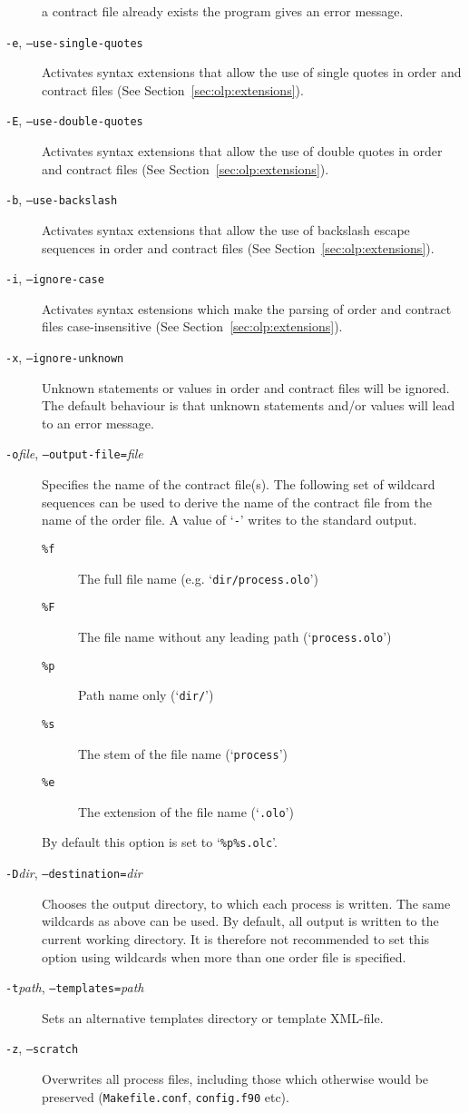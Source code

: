\begin{description}
      a contract file already exists the program gives an error message.
\item[\texttt{-e}, \texttt{--use-single-quotes}]
      Activates syntax extensions that allow the use of single quotes in
      order and contract files (See Section~\ref{sec:olp:extensions}).
\item[\texttt{-E}, \texttt{--use-double-quotes}]
      Activates syntax extensions that allow the use of double quotes in
      order and contract files (See Section~\ref{sec:olp:extensions}).
\item[\texttt{-b}, \texttt{--use-backslash}]
      Activates syntax extensions that allow the use of backslash escape
      sequences in
      order and contract files (See Section~\ref{sec:olp:extensions}).
\item[\texttt{-i}, \texttt{--ignore-case}] 
      Activates syntax estensions which make the parsing of order
      and contract files case-insensitive
      (See Section~\ref{sec:olp:extensions}).
\item[\texttt{-x}, \texttt{--ignore-unknown}]
      Unknown statements or values in order and contract files will be ignored.
      The default behaviour is that unknown statements and/or values will lead
      to an error message.
\item[\texttt{-o}\textit{file}, \texttt{--output-file=}\textit{file}]
      Specifies the name of the contract file(s). The following set of
      wildcard sequences can be used to derive the name of the contract file
      from the name of the order file. A value of
      `\texttt{-}' writes to the standard output.
      \begin{description}
      \item[\texttt{\%f}] The full file name (e.g. `\texttt{dir/process.olo}')
      \item[\texttt{\%F}] The file name without any leading path
         (`\texttt{process.olo}')
      \item[\texttt{\%p}] Path name only (`\texttt{dir/}')
      \item[\texttt{\%s}] The stem of the file name (`\texttt{process}')
      \item[\texttt{\%e}] The extension of the file name (`\texttt{.olo}')
      \end{description}
      By default this option is set to `\texttt{\%p\%s.olc}'.
\item[\texttt{-D}\textit{dir}, \texttt{--destination=}\textit{dir}]
      Chooses the output directory, to which each process is written.
      The same wildcards as above can be used. By default, all output is
      written to the current working directory. It is therefore not recommended
      to set this option using wildcards when more than one order file is
      specified.
\item[\texttt{-t}\textit{path}, \texttt{--templates=}\textit{path}]
      Sets an alternative templates directory or template
      XML-file.
\item[\texttt{-z}, \texttt{--scratch}]
      Overwrites all process files, including those which otherwise
      would be preserved (\texttt{Makefile.conf}, \texttt{config.f90} etc).
\end{description}

